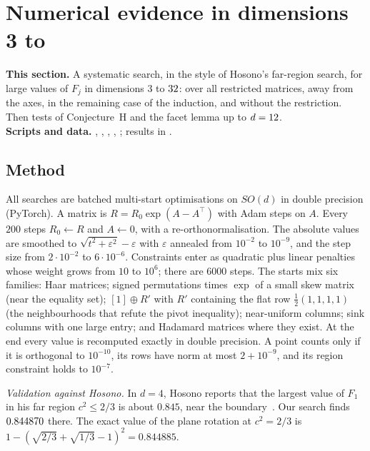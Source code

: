 \documentclass[11pt,a4paper]{article}
\begin{document}
\section{Numerical evidence in dimensions 3 to \texorpdfstring{\maxdim}{32}}\label{sec:numerics}

\begin{summarybox}
\textbf{This section.} A systematic search, in the style of Hosono's far-region search, for large values of $F_j$ in dimensions $3$ to $32$: over all restricted matrices, away from the axes, in the remaining case of the induction, and without the restriction. Then tests of Conjecture~H and the facet lemma up to $d=12$.\\
\textbf{Scripts and data.} , , , , ; results in .
\end{summarybox}

\subsection{Method}
All searches are batched multi-start optimisations on $SO(d)$ in double precision (PyTorch). A matrix is $R=R_0\exp(A-A^\top)$ with Adam steps on $A$. Every $200$ steps $R_0\gets R$ and $A\gets0$, with a re-orthonormalisation. The absolute values are smoothed to $\sqrt{t^2+\varepsilon^2}-\varepsilon$ with $\varepsilon$ annealed from $10^{-2}$ to $10^{-9}$, and the step size from $2\cdot10^{-2}$ to $6\cdot10^{-6}$. Constraints enter as quadratic plus linear penalties whose weight grows from $10$ to $10^6$; there are $6000$ steps. The starts mix six families: Haar matrices; signed permutations times $\exp$ of a small skew matrix (near the equality set); $[1]\oplus R'$ with $R'$ containing the flat row $\frac12(1,1,1,1)$ (the neighbourhoods that refute the pivot inequality); near-uniform columns; sink columns with one large entry; and Hadamard matrices where they exist. At the end every value is recomputed exactly in double precision. A point counts only if it is orthogonal to $10^{-10}$, its rows have norm at most $2+10^{-9}$, and its region constraint holds to $10^{-7}$.

\emph{Validation against Hosono.} In $d=4$, Hosono reports that the largest value of $F_1$ in his far region $c^2\le2/3$ is about $0.845$, near the boundary~\cite{hosono}. Our search finds $0.844870$ there. The exact value of the plane rotation at $c^2=2/3$ is $1-(\sqrt{2/3}+\sqrt{1/3}-1)^2=0.844885$.
\end{document}
